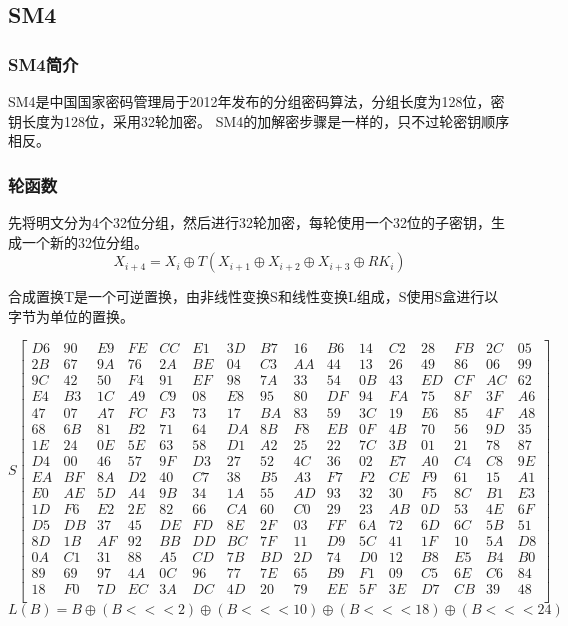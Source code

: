 \subsection{SM4}
\subsubsection{SM4简介}
SM4是中国国家密码管理局于2012年发布的分组密码算法，分组长度为128位，密钥长度为128位，采用32轮加密。
SM4的加解密步骤是一样的，只不过轮密钥顺序相反。

\subsubsection{轮函数}
先将明文分为4个32位分组，然后进行32轮加密，每轮使用一个32位的子密钥，生成一个新的32位分组。
$$
X_{i+4} = X_i \oplus T(X_{i+1} \oplus X_{i+2} \oplus X_{i+3} \oplus RK_i)
$$

合成置换T是一个可逆置换，由非线性变换S和线性变换L组成，S使用S盒进行以字节为单位的置换。

$$
S
\begin{bmatrix}
D6 & 90 & E9 & FE & CC & E1 & 3D & B7 & 16 & B6 & 14 & C2 & 28 & FB & 2C & 05 \\
2B & 67 & 9A & 76 & 2A & BE & 04 & C3 & AA & 44 & 13 & 26 & 49 & 86 & 06 & 99 \\
9C & 42 & 50 & F4 & 91 & EF & 98 & 7A & 33 & 54 & 0B & 43 & ED & CF & AC & 62 \\
E4 & B3 & 1C & A9 & C9 & 08 & E8 & 95 & 80 & DF & 94 & FA & 75 & 8F & 3F & A6 \\
47 & 07 & A7 & FC & F3 & 73 & 17 & BA & 83 & 59 & 3C & 19 & E6 & 85 & 4F & A8 \\
68 & 6B & 81 & B2 & 71 & 64 & DA & 8B & F8 & EB & 0F & 4B & 70 & 56 & 9D & 35 \\
1E & 24 & 0E & 5E & 63 & 58 & D1 & A2 & 25 & 22 & 7C & 3B & 01 & 21 & 78 & 87 \\
D4 & 00 & 46 & 57 & 9F & D3 & 27 & 52 & 4C & 36 & 02 & E7 & A0 & C4 & C8 & 9E \\
EA & BF & 8A & D2 & 40 & C7 & 38 & B5 & A3 & F7 & F2 & CE & F9 & 61 & 15 & A1 \\
E0 & AE & 5D & A4 & 9B & 34 & 1A & 55 & AD & 93 & 32 & 30 & F5 & 8C & B1 & E3 \\
1D & F6 & E2 & 2E & 82 & 66 & CA & 60 & C0 & 29 & 23 & AB & 0D & 53 & 4E & 6F \\
D5 & DB & 37 & 45 & DE & FD & 8E & 2F & 03 & FF & 6A & 72 & 6D & 6C & 5B & 51 \\
8D & 1B & AF & 92 & BB & DD & BC & 7F & 11 & D9 & 5C & 41 & 1F & 10 & 5A & D8 \\
0A & C1 & 31 & 88 & A5 & CD & 7B & BD & 2D & 74 & D0 & 12 & B8 & E5 & B4 & B0 \\
89 & 69 & 97 & 4A & 0C & 96 & 77 & 7E & 65 & B9 & F1 & 09 & C5 & 6E & C6 & 84 \\
18 & F0 & 7D & EC & 3A & DC & 4D & 20 & 79 & EE & 5F & 3E & D7 & CB & 39 & 48 \\
\end{bmatrix}
$$
$$
L(B) = B \oplus (B <<< 2) \oplus (B <<< 10) \oplus (B <<< 18) \oplus (B <<< 24)
$$

